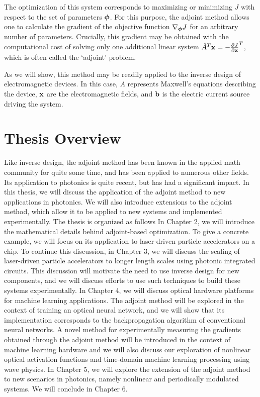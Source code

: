 The optimization of this system corresponds to maximizing or minimizing $J$ with respect to the set of parameters $\bm{\phi}$.
For this purpose, the adjoint method allows one to calculate the gradient of the objective function $\nabla_{\bm{\phi}} J$ for an arbitrary number of parameters.
Crucially, this gradient may be obtained with the computational cost of solving only one additional linear system $\hat{A}^T \bar{\mathbf{x}} = -\frac{\partial J}{\partial \mathbf{x}}^T$, which is often called the `adjoint' problem.

As we will show, this method may be readily applied to the inverse design of electromagnetic devices.
In this case, $A$ represents Maxwell's equations describing the device, $\mathbf{x}$ are the electromagnetic fields, and $\mathbf{b}$ is the electric current source driving the system.

\section{Thesis Overview}

Like inverse design, the adjoint method has been known in the applied math community for quite some time, and has been applied to numerous other fields.
Its application to photonics is quite recent, but has had a significant impact.
In this thesis, we will discuss the application of the adjoint method to new applications in photonics.
We will also introduce extensions to the adjoint method, which allow it to be applied to new systems and implemented experimentally.
The thesis is organized as follows
In Chapter 2, we will introduce the mathematical details behind adjoint-based optimization.  
To give a concrete example, we will focus on its application to laser-driven particle accelerators on a chip.
To continue this discussion, in Chapter 3, we will discuss the scaling of laser-driven particle accelerators to longer length scales using photonic integrated circuits.
This discussion will motivate the need to use inverse design for new components, and we will discuss efforts to use such techniques to build these systems experimentally.
In Chapter 4, we will discuss optical hardware platforms for machine learning applications.
The adjoint method will be explored in the context of training an optical neural network, and we will show that its implementation corresponds to the backpropagation algorithm of conventional neural networks.
A novel method for experimentally measuring the gradients obtained through the adjoint method will be introduced in the context of machine learning hardware and we will also discuss our exploration of nonlinear optical activation functions and time-domain machine learning processing using wave physics.
In Chapter 5, we will explore the extension of the adjoint method to new scenarios in photonics, namely nonlinear and periodically modulated systems.
We will conclude in Chapter 6.
